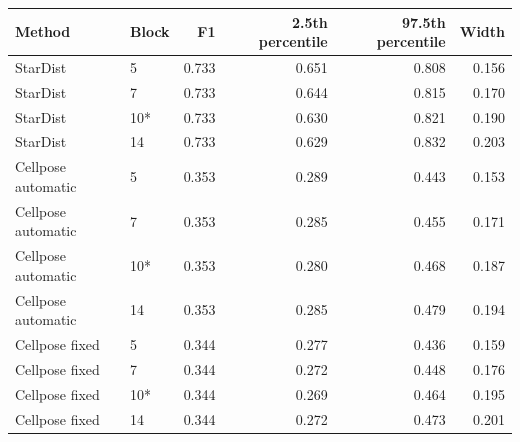 \begin{tabular}{llrrrr}
\toprule
Method & Block & F1 & 2.5th percentile & 97.5th percentile & Width \\
\midrule
StarDist & 5 & 0.733 & 0.651 & 0.808 & 0.156 \\
StarDist & 7 & 0.733 & 0.644 & 0.815 & 0.170 \\
StarDist & 10* & 0.733 & 0.630 & 0.821 & 0.190 \\
StarDist & 14 & 0.733 & 0.629 & 0.832 & 0.203 \\
\addlinespace
Cellpose automatic & 5 & 0.353 & 0.289 & 0.443 & 0.153 \\
Cellpose automatic & 7 & 0.353 & 0.285 & 0.455 & 0.171 \\
Cellpose automatic & 10* & 0.353 & 0.280 & 0.468 & 0.187 \\
Cellpose automatic & 14 & 0.353 & 0.285 & 0.479 & 0.194 \\
\addlinespace
Cellpose fixed & 5 & 0.344 & 0.277 & 0.436 & 0.159 \\
Cellpose fixed & 7 & 0.344 & 0.272 & 0.448 & 0.176 \\
Cellpose fixed & 10* & 0.344 & 0.269 & 0.464 & 0.195 \\
Cellpose fixed & 14 & 0.344 & 0.272 & 0.473 & 0.201 \\
\bottomrule
\end{tabular}
